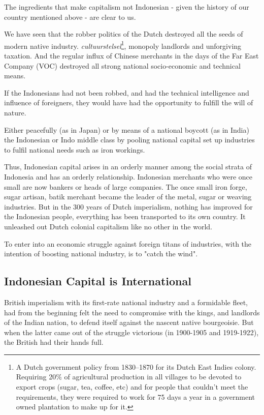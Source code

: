 The ingredients that make capitalism not Indonesian - given the history of our country mentioned above - are clear to us.\nline

We have seen that the robber politics of the Dutch destroyed all the seeds of modern native industry. 
\emph{cultuurstelsel}\footnote[4]{A Dutch government policy from 1830–1870 for its Dutch East Indies colony. Requiring 20\% of agricultural production in all villages to be devoted to export crops (sugar, tea, coffee, etc) and for people that couldn't meet the requirements, they were required to work for 75 days a year in a government owned plantation to make up for it.}, 
monopoly landlords and unforgiving taxation. And the regular influx of Chinese merchants in 
the days of the Far East Company (VOC) destroyed all strong national socio-economic and technical means.\nline

If the Indonesians had not been robbed, and had the technical intelligence 
and influence of foreigners, they would have had the opportunity to fulfill the will of nature.\nline

Either peacefully (as in Japan) or by means of a national boycott (as in India) 
the Indonesian or Indo middle class by pooling national capital set up industries to fulfil national needs such as iron workings.\nline

Thus, Indonesian capital arises in an orderly manner among the social strata 
of Indonesia and has an orderly relationship. Indonesian merchants who were once 
small are now bankers or heads of large companies. The once small iron forge, sugar 
artisan, batik merchant became the leader of the metal, sugar or weaving industries. 
But in the 300 years of Dutch imperialism, nothing has improved for the Indonesian 
people, everything has been transported to its own country. It unleashed out Dutch colonial capitalism like no other in the world.\nline

To enter into an economic struggle against foreign titans of industries, 
with the intention of boosting national industry, is to "catch the wind".\nline

\subsection{Indonesian Capital is International}

British imperialism with its first-rate national industry and a formidable fleet, had from 
the beginning felt the need to compromise with the kings, and landlords of the Indian nation, 
to defend itself against the nascent native bourgeoisie. But when the latter came out of the 
struggle victorious (in 1900-1905 and 1919-1922), the British had their hands full.\nline

